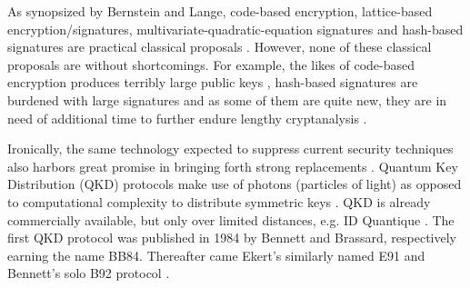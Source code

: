 As synopsized by Bernstein and Lange, code-based encryption, lattice-based encryption/signatures, multivariate-quadratic-equation signatures and hash-based signatures are practical classical proposals \cite{Post_Q_Cryptog}. However, none of these classical proposals are without shortcomings. For example, the likes of code-based encryption produces terribly large public keys \cite{Post_Q_Cryptog}, hash-based signatures are burdened with large signatures \cite{Sec_Risk} and as some of them are quite new, they are in need of additional time to further endure lengthy cryptanalysis \cite{Sec_Risk}.


Ironically, the same technology expected to suppress current security techniques also harbors great promise in bringing forth strong replacements \cite{Q_Cryptog}. 
Quantum Key Distribution (QKD) protocols make use of photons (particles of light) as opposed to computational complexity to distribute symmetric keys \cite{Impact_QC_Cryptog_1}. QKD is already commercially available, but only over limited distances, e.g. ID Quantique \cite{IDQ}. The first QKD protocol was published in 1984 by Bennett and Brassard, respectively earning the name BB84. Thereafter came Ekert's similarly named E91 and Bennett's solo B92 protocol \cite{Q_Cryptog}.
